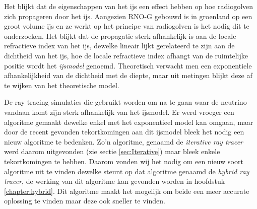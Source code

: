 \documentclass[11pt,a4paper,faculty=we,language=en,doctype=report]{cls/ugent-doc}
\begin{document}
Het blijkt dat de eigenschappen van het ijs een effect hebben op hoe radiogolven zich propageren door het ijs.
Aangezien RNO-G gebouwd is in groenland op een groot volume ijs en ze werkt op het principe van radiogolven
is het nodig dit te onderzoeken. Het blijkt dat de propagatie sterk afhankelijk is aan de locale refractieve
index van het ijs, dewelke lineair lijkt gerelateerd te zijn aan de dichtheid van het ijs, hoe de locale
refractieve index afhangt van de ruimtelijke positie wordt het \textit{ijsmodel} genoemd. Theoretisch
verwacht men een exponentiele afhankelijkheid van de dichtheid met de diepte, maar uit metingen blijkt deze
af te wijken van het theoretische model. 

De ray tracing simulaties die gebruikt worden om na te gaan waar de neutrino
vandaan komt zijn sterk afhankelijk van het ijsmodel.  Er werd vroeger een
algoritme gemaakt dewelke enkel met het exponentieel model kan omgaan, maar
door de recent gevonden tekortkomingen aan dit ijsmodel bleek het nodig een
nieuw algoritme te bedenken. Zo'n algoritme, genaamd de \textit{iterative ray
tracer} werd daarom uitgevonden (zie sectie \ref{sec:Iterative}) maar bleek
enkele tekortkomingen te hebben. Daarom vonden wij het nodig om een nieuw soort
algoritme uit te vinden dewelke steunt op dat algoritme genaamd de
\textit{hybrid ray tracer}, de werking van dit algoritme kan gevonden worden in
hoofdstuk \ref{chapter:hybrid}. Dit algoritme maakt het mogelijk om beide een
meer accurate oplossing te vinden maar deze ook sneller te vinden.
\end{document}
